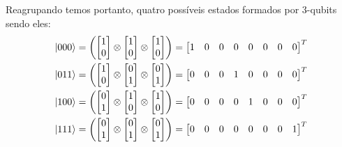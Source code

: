 Reagrupando temos portanto, quatro possíveis estados formados por 3-qubits sendo eles:
\begin{equation}\label{eq:3qubit}
	\begin{split}
\ket{000} &= \left( \begin{bmatrix}
1 \\
0
\end{bmatrix} \otimes \begin{bmatrix}
1 \\
0
\end{bmatrix} \otimes \begin{bmatrix}
1 \\
0
\end{bmatrix}\right) = \begin{bmatrix}
1 & 0 & 0 & 0 & 0 & 0 & 0 & 0
\end{bmatrix}^T \\
\ket{011} &= \left( \begin{bmatrix}
1 \\
0
\end{bmatrix} \otimes \begin{bmatrix}
0 \\
1
\end{bmatrix} \otimes \begin{bmatrix}
0 \\
1
\end{bmatrix}\right) = \begin{bmatrix}
0 & 0 & 0 & 1 & 0 & 0 & 0 & 0
\end{bmatrix}^T \\
\ket{100} &= \left( \begin{bmatrix}
0 \\
1
\end{bmatrix} \otimes \begin{bmatrix}
1 \\
0
\end{bmatrix} \otimes \begin{bmatrix}
1 \\
0
\end{bmatrix}\right) = \begin{bmatrix}
0 & 0 & 0 & 0 & 1 & 0 & 0 & 0
\end{bmatrix}^T \\
\ket{111} &=\left( \begin{bmatrix}
0 \\
1
\end{bmatrix} \otimes \begin{bmatrix}
0 \\
1
\end{bmatrix} \otimes \begin{bmatrix}
0 \\
1
\end{bmatrix}\right) = \begin{bmatrix}
0 & 0 & 0 & 0 & 0 & 0 & 0 & 1
\end{bmatrix}^T
	\end{split}
\end{equation}


